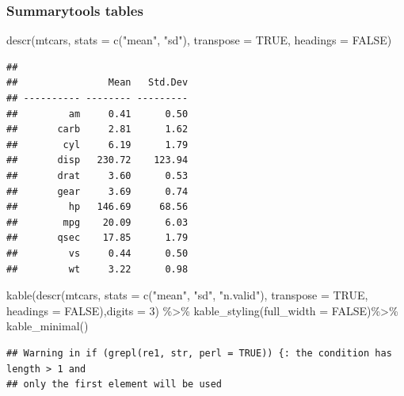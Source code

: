 \documentclass[
]{article}
\newenvironment{Shaded}{\begin{snugshade}}{\end{snugshade}}
\newcommand{\AttributeTok}[1]{\textcolor[rgb]{0.77,0.63,0.00}{#1}}
\newcommand{\ConstantTok}[1]{\textcolor[rgb]{0.00,0.00,0.00}{#1}}
\newcommand{\DecValTok}[1]{\textcolor[rgb]{0.00,0.00,0.81}{#1}}
\newcommand{\FunctionTok}[1]{\textcolor[rgb]{0.00,0.00,0.00}{#1}}
\newcommand{\NormalTok}[1]{#1}
\newcommand{\SpecialCharTok}[1]{\textcolor[rgb]{0.00,0.00,0.00}{#1}}
\newcommand{\StringTok}[1]{\textcolor[rgb]{0.31,0.60,0.02}{#1}}
\begin{document}
\hypertarget{summarytools-tables}{%
\subsubsection{Summarytools tables}\label{summarytools-tables}}

\begin{Shaded}
\begin{Highlighting}[]
\FunctionTok{descr}\NormalTok{(mtcars, }\AttributeTok{stats =} \FunctionTok{c}\NormalTok{(}\StringTok{"mean"}\NormalTok{, }\StringTok{"sd"}\NormalTok{), }\AttributeTok{transpose =} \ConstantTok{TRUE}\NormalTok{, }\AttributeTok{headings =} \ConstantTok{FALSE}\NormalTok{)}
\end{Highlighting}
\end{Shaded}

\begin{verbatim}
## 
##                Mean   Std.Dev
## ---------- -------- ---------
##         am     0.41      0.50
##       carb     2.81      1.62
##        cyl     6.19      1.79
##       disp   230.72    123.94
##       drat     3.60      0.53
##       gear     3.69      0.74
##         hp   146.69     68.56
##        mpg    20.09      6.03
##       qsec    17.85      1.79
##         vs     0.44      0.50
##         wt     3.22      0.98
\end{verbatim}

\begin{Shaded}
\begin{Highlighting}[]
\FunctionTok{kable}\NormalTok{(}\FunctionTok{descr}\NormalTok{(mtcars, }\AttributeTok{stats =} \FunctionTok{c}\NormalTok{(}\StringTok{"mean"}\NormalTok{, }\StringTok{"sd"}\NormalTok{, }\StringTok{"n.valid"}\NormalTok{), }\AttributeTok{transpose =} \ConstantTok{TRUE}\NormalTok{,}
              \AttributeTok{headings =} \ConstantTok{FALSE}\NormalTok{),}\AttributeTok{digits =} \DecValTok{3}\NormalTok{) }\SpecialCharTok{\%\textgreater{}\%} 
  \FunctionTok{kable\_styling}\NormalTok{(}\AttributeTok{full\_width =} \ConstantTok{FALSE}\NormalTok{)}\SpecialCharTok{\%\textgreater{}\%} \FunctionTok{kable\_minimal}\NormalTok{()}
\end{Highlighting}
\end{Shaded}

\begin{verbatim}
## Warning in if (grepl(re1, str, perl = TRUE)) {: the condition has length > 1 and
## only the first element will be used
\end{verbatim}
\end{document}
